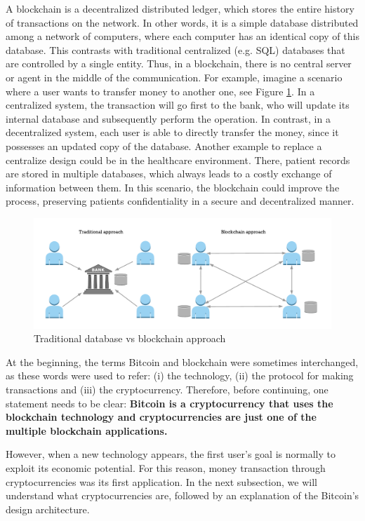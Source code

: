 A blockchain is a decentralized distributed ledger, which stores the entire history of transactions on the network. In other words, it is a simple database distributed among a network of computers, where each computer has an identical copy of this database. This contrasts with traditional centralized (e.g. SQL) databases that are controlled by a single entity. Thus, in a blockchain, there is no central server or agent in the middle of the communication. For example, imagine a scenario where a user wants to transfer money to another one, see Figure \ref{fig:CentralizedvsDecentralized}. In a centralized system, the transaction will go first to the bank, who will update its internal database and subsequently perform the operation. In contrast, in a decentralized system, each user is able to directly transfer the money, since it possesses an updated copy of the database. Another example to replace a centralize design could be in the healthcare environment. There, patient records are stored in multiple databases, which always leads to a costly exchange of information between them. In this scenario, the blockchain could improve the process, preserving patients confidentiality in a secure and decentralized manner.

\begin{figure}[bth]
	\centering
	\includegraphics[width=0.8\linewidth]{gfx/cenVsDec}    
  	\caption{Traditional database vs blockchain approach}
  	\label{fig:CentralizedvsDecentralized}
\end{figure}

At the beginning, the terms Bitcoin and blockchain were sometimes interchanged, as these words were used to refer: (i) the technology, (ii) the protocol for making transactions and (iii) the cryptocurrency. Therefore, before continuing, one statement needs to be clear: \textbf{Bitcoin is a cryptocurrency that uses the blockchain technology and cryptocurrencies are just one of the multiple blockchain applications.} 

However, when a new technology appears, the first user's goal is normally to exploit its economic potential. For this reason, money transaction through cryptocurrencies was its first application. In the next subsection, we will understand what cryptocurrencies are, followed by an explanation of the Bitcoin's design architecture.

